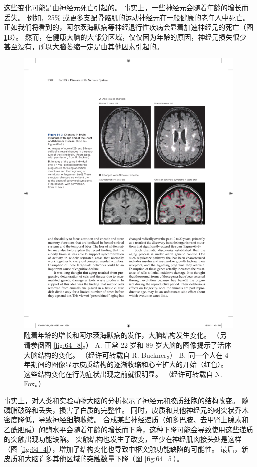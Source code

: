 这些变化可能是由神经元死亡引起的。
事实上，一些神经元会随着年龄的增长而丢失。
例如，25\% 或更多支配骨骼肌的运动神经元在一般健康的老年人中死亡。
正如我们将看到的，阿尔茨海默病等神经退行性疾病会显着加速神经元的死亡（图 \ref{fig:64_3}B）。
然而，在健康大脑的大部分区域，仅仅因为年龄的原因，神经元损失很少甚至没有，所以大脑萎缩一定是由其他因素引起的。


\begin{figure}[htbp]
	\centering
	\includegraphics[width=0.7\linewidth]{chap64/fig_64_3}
	\caption{随着年龄的增长和阿尔茨海默病的发作，大脑结构发生变化。 （另请参阅图 \ref{fig:64_8}。） A. 正常 22 岁和 89 岁大脑的图像揭示了活体大脑结构的变化。 （经许可转载自 R. Buckner。） B. 同一个人在 4 年期间的图像显示皮质结构的逐渐收缩和心室扩大的开始（红色）。 这些结构变化在行为症状出现之前就很明显。 （经许可转载自 N. Fox。）}
	\label{fig:64_3}
\end{figure}

事实上，对人类和实验动物大脑的分析揭示了神经元和胶质细胞的结构改变。
髓磷脂破碎和丢失，损害了白质的完整性。
同时，皮质和其他神经元的树突状乔木密度降低，导致神经细胞收缩。
合成某些神经递质（如多巴胺、去甲肾上腺素和乙酰胆碱）的酶水平会随着年龄的增长而下降，这种下降可能会导致使用这些递质的突触出现功能缺陷。
突触结构也发生了改变，至少在神经肌肉接头处是这样（图 \ref{fig:64_4}），增加了结构变化也导致中枢突触功能缺陷的可能性。
最后，新皮质和大脑许多其他区域的突触数量下降（图 \ref{fig:64_5}）。


